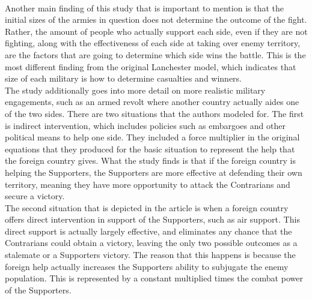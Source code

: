 \documentclass{article}
\begin{document}
\medskip
\\
Another main finding of this study that is important to mention is that the initial sizes of the armies in question does not determine the outcome of the fight. Rather, the amount of people who actually support each side, even if they are not fighting, along with the effectiveness of each side at taking over enemy territory, are the factors that are going to determine which side wins the battle. This is the most different finding from the original Lanchester model, which indicates that size of each military is how to determine casualties and winners. 
\medskip	
\\The study additionally goes into more detail on more realistic military engagements, such as an armed revolt where another country actually aides one of the two sides. There are two situations that the authors modeled for. The first is indirect intervention, which includes policies such as embargoes and other political means to help one side. They included a force multiplier in the original equations that they produced for the basic situation to represent the help that the foreign country gives. What the study finds is that if the foreign country is helping the Supporters, the Supporters are more effective at defending their own territory, meaning they have more opportunity to attack the Contrarians and secure a victory.
\medskip
\\The second situation that is depicted in the article is when a foreign country offers direct intervention in support of the Supporters, such as air support. This direct support is actually largely effective, and eliminates any chance that the Contrarians could obtain a victory, leaving the only two possible outcomes as a stalemate or a Supporters victory. The reason that this happens is because the foreign help actually increases the Supporters ability to subjugate the enemy population. This is represented by a constant multiplied times the combat power of the Supporters. 
\medskip
\end{document}
